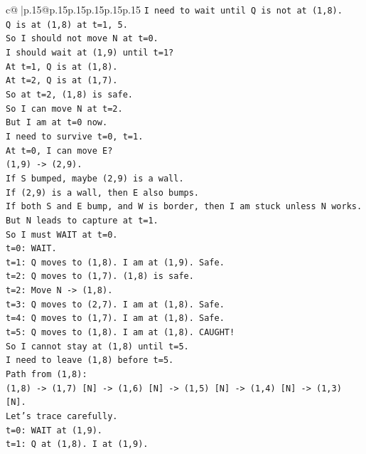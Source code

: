 \documentclass{article}
\begin{document}
{\begin{supertabular}{c@{$\;$}|p{.15\linewidth}@{}p{.15\linewidth}p{.15\linewidth}p{.15\linewidth}p{.15\linewidth}p{.15\linewidth}}
{{{\texttt{I need to wait until Q is not at (1,8).} \\
\texttt{Q is at (1,8) at t=1, 5.} \\
\texttt{So I should not move N at t=0.} \\
\texttt{I should wait at (1,9) until t=1?} \\
\texttt{At t=1, Q is at (1,8).} \\
\texttt{At t=2, Q is at (1,7).} \\
\texttt{So at t=2, (1,8) is safe.} \\
\texttt{So I can move N at t=2.} \\
\texttt{But I am at t=0 now.} \\
\texttt{I need to survive t=0, t=1.} \\
\texttt{At t=0, I can move E?} \\
\texttt{(1,9) {-}> (2,9).} \\
\texttt{If S bumped, maybe (2,9) is a wall.} \\
\texttt{If (2,9) is a wall, then E also bumps.} \\
\texttt{If both S and E bump, and W is border, then I am stuck unless N works.} \\
\texttt{But N leads to capture at t=1.} \\
\texttt{So I must WAIT at t=0.} \\
\texttt{t=0: WAIT.} \\
\texttt{t=1: Q moves to (1,8). I am at (1,9). Safe.} \\
\texttt{t=2: Q moves to (1,7). (1,8) is safe.} \\
\texttt{t=2: Move N {-}> (1,8).} \\
\texttt{t=3: Q moves to (2,7). I am at (1,8). Safe.} \\
\texttt{t=4: Q moves to (1,7). I am at (1,8). Safe.} \\
\texttt{t=5: Q moves to (1,8). I am at (1,8). CAUGHT!} \\
\texttt{So I cannot stay at (1,8) until t=5.} \\
\texttt{I need to leave (1,8) before t=5.} \\
\texttt{Path from (1,8):} \\
\texttt{(1,8) {-}> (1,7) {[}N{]} {-}> (1,6) {[}N{]} {-}> (1,5) {[}N{]} {-}> (1,4) {[}N{]} {-}> (1,3) {[}N{]}.} \\
\texttt{Let's trace carefully.} \\
\texttt{t=0: WAIT at (1,9).} \\
\texttt{t=1: Q at (1,8). I at (1,9).} \\
}}}
\end{supertabular}}
\end{document}
